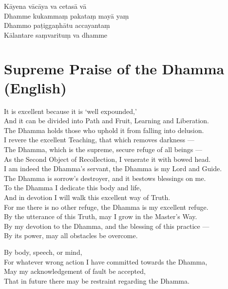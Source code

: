 
Kāyena vācāya va cetasā vā\\
Dhamme kukammaṃ pakataṃ mayā yaṃ\\
Dhammo paṭiggaṇhātu accayantaṃ\\
Kālantare saṃvarituṃ va dhamme

\section*{Supreme Praise of the Dhamma (English)}

\begin{leader}
\end{leader}

It is excellent because it is `well expounded,'\\
And it can be divided into Path and Fruit, Learning and Liberation.\\
The Dhamma holds those who uphold it from falling into delusion.\\
I revere the excellent Teaching, that which removes darkness ---\\
The Dhamma, which is the supreme, secure refuge of all beings ---\\
As the Second Object of Recollection, I venerate it with bowed head.\\
I am indeed the Dhamma's servant, the Dhamma is my Lord and Guide.\\
The Dhamma is sorrow's destroyer, and it bestows blessings on me.\\
To the Dhamma I dedicate this body and life,\\
And in devotion I will walk this excellent way of Truth.\\
For me there is no other refuge, the Dhamma is my excellent refuge.\\
By the utterance of this Truth, may I grow in the Master's Way.\\
By my devotion to the Dhamma, and the blessing of this practice ---\\
By its power, may all obstacles be overcome.


By body, speech, or mind,\\
For whatever wrong action I have committed towards the Dhamma,\\
May my acknowledgement of fault be accepted,\\
That in future there may be restraint regarding the Dhamma.

